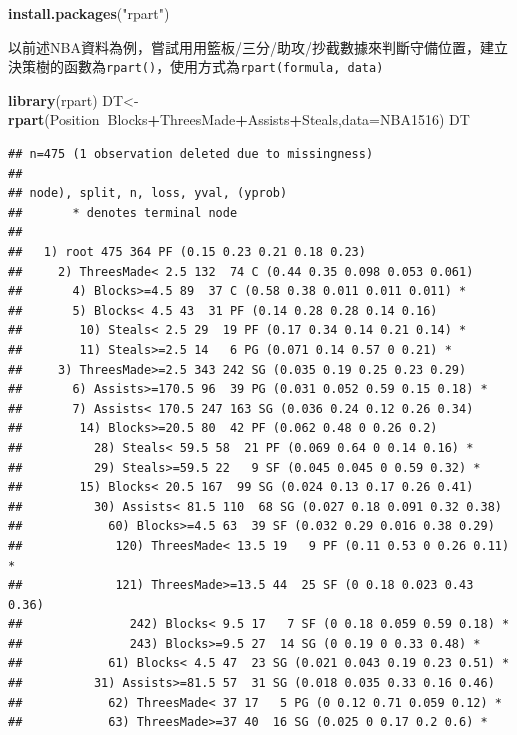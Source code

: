 \documentclass[
]{book}
\newenvironment{Shaded}{\begin{snugshade}}{\end{snugshade}}
\newcommand{\DataTypeTok}[1]{\textcolor[rgb]{0.13,0.29,0.53}{#1}}
\newcommand{\KeywordTok}[1]{\textcolor[rgb]{0.13,0.29,0.53}{\textbf{#1}}}
\newcommand{\NormalTok}[1]{#1}
\newcommand{\OperatorTok}[1]{\textcolor[rgb]{0.81,0.36,0.00}{\textbf{#1}}}
\newcommand{\StringTok}[1]{\textcolor[rgb]{0.31,0.60,0.02}{#1}}
\begin{document}
\begin{Shaded}
\begin{Highlighting}[]
\KeywordTok{install.packages}\NormalTok{(}\StringTok{"rpart"}\NormalTok{)}
\end{Highlighting}
\end{Shaded}

以前述NBA資料為例，嘗試用用籃板/三分/助攻/抄截數據來判斷守備位置，建立決策樹的函數為\texttt{rpart()}，使用方式為\texttt{rpart(formula,\ data)}

\begin{Shaded}
\begin{Highlighting}[]
\KeywordTok{library}\NormalTok{(rpart)}
\NormalTok{DT<-}\KeywordTok{rpart}\NormalTok{(Position}\OperatorTok{~}\NormalTok{Blocks}\OperatorTok{+}\NormalTok{ThreesMade}\OperatorTok{+}\NormalTok{Assists}\OperatorTok{+}\NormalTok{Steals,}\DataTypeTok{data=}\NormalTok{NBA1516)}
\NormalTok{DT}
\end{Highlighting}
\end{Shaded}

\begin{verbatim}
## n=475 (1 observation deleted due to missingness)
## 
## node), split, n, loss, yval, (yprob)
##       * denotes terminal node
## 
##   1) root 475 364 PF (0.15 0.23 0.21 0.18 0.23)  
##     2) ThreesMade< 2.5 132  74 C (0.44 0.35 0.098 0.053 0.061)  
##       4) Blocks>=4.5 89  37 C (0.58 0.38 0.011 0.011 0.011) *
##       5) Blocks< 4.5 43  31 PF (0.14 0.28 0.28 0.14 0.16)  
##        10) Steals< 2.5 29  19 PF (0.17 0.34 0.14 0.21 0.14) *
##        11) Steals>=2.5 14   6 PG (0.071 0.14 0.57 0 0.21) *
##     3) ThreesMade>=2.5 343 242 SG (0.035 0.19 0.25 0.23 0.29)  
##       6) Assists>=170.5 96  39 PG (0.031 0.052 0.59 0.15 0.18) *
##       7) Assists< 170.5 247 163 SG (0.036 0.24 0.12 0.26 0.34)  
##        14) Blocks>=20.5 80  42 PF (0.062 0.48 0 0.26 0.2)  
##          28) Steals< 59.5 58  21 PF (0.069 0.64 0 0.14 0.16) *
##          29) Steals>=59.5 22   9 SF (0.045 0.045 0 0.59 0.32) *
##        15) Blocks< 20.5 167  99 SG (0.024 0.13 0.17 0.26 0.41)  
##          30) Assists< 81.5 110  68 SG (0.027 0.18 0.091 0.32 0.38)  
##            60) Blocks>=4.5 63  39 SF (0.032 0.29 0.016 0.38 0.29)  
##             120) ThreesMade< 13.5 19   9 PF (0.11 0.53 0 0.26 0.11) *
##             121) ThreesMade>=13.5 44  25 SF (0 0.18 0.023 0.43 0.36)  
##               242) Blocks< 9.5 17   7 SF (0 0.18 0.059 0.59 0.18) *
##               243) Blocks>=9.5 27  14 SG (0 0.19 0 0.33 0.48) *
##            61) Blocks< 4.5 47  23 SG (0.021 0.043 0.19 0.23 0.51) *
##          31) Assists>=81.5 57  31 SG (0.018 0.035 0.33 0.16 0.46)  
##            62) ThreesMade< 37 17   5 PG (0 0.12 0.71 0.059 0.12) *
##            63) ThreesMade>=37 40  16 SG (0.025 0 0.17 0.2 0.6) *
\end{verbatim}
\end{document}
